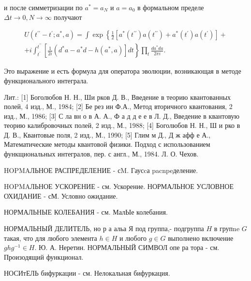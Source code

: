 \documentclass[10pt]{article}
\begin{document}
и после симметризации по $a^{*}=a_{N}$ и $a=a_{0}$ в формальном пределе $\Delta t \rightarrow 0, N \rightarrow \infty$ получают



\[

\begin{gathered}

U\left(t^{\prime \prime}-t^{\prime} ; a^{*}, a\right)=\int \exp \left\{\frac{1}{2}\left[a^{*}\left(t^{\prime \prime}\right) a\left(t^{\prime \prime}\right)+a^{*}\left(t^{\prime}\right) a\left(t^{\prime}\right)\right]+\right. \\

+i \int_{t^{\prime}}^{t^{\prime \prime}}\left[\frac{1}{2 i}\left(d^{*} a-a^{*} d-h\left(a^{*}, a\right)\right] d t\right\} \prod_{t} \frac{d a^{*} d a}{2 \pi i} .

\end{gathered}

\]



Это выражение и есть формула для оператора эволюции, возникающая в методе функционального интеграла.



Лит.: [1] Боголюбов Н. Н., Ши рков Д. В., Введение в теорию квантованных полей, 4 изд., М., 1984; [2] Бе рез ин Ф.А., Метод вторичного квантования, 2 изд., М., 1986; [3] С ла вн о в А. А., Ф а д д е е в Л. Д., Введение в квантовую теорию калибровочных полей, 2 изд., М., 1988; [4] Боголюбов Н. Н., Ш и рко в Д. В., Квантовые поля, 2 изд., М., 1990; [5] Глим м Д., Д ж афф е А., Математические методы квантовой физики. Подход с использованием функщиональных интегралов, пер. с англ., М., 1984. Л. $О$. Чехов.



HOPMAЛЬНОЕ РАСПРЕДЕЛЕНИЕ - сM. Гаусcа pacnpeделение.



HOPMAЛЬНОЕ УСКОРЕНИЕ - см. Ускорение. НОРМАЛЬНОЕ УСЛОВНОЕ ОХИДАНИЕ - сМ. Условно ожидание.



НОРМАЛЬНЫЕ КОЛЕБАНИЯ - см. МалЫе колебания.



НОРМАЛЬНЫЙ ДЕЛИТЕЛЬ, но р а альа Я под группа,- подгруппа $H$ в групne $G$ такая, что для любого элемента $h \in H$ и любого $g \in G$ выполнено включение $g h g^{-1} \in H$. Ю. А. Неретин. НОРМАЛЬНЫЙ СИМВОЛ опе ра тора - см. Произодящий функционал.



НОСИтЕЛЬ бифуркации - см. Нелокальная бифуркация.
\end{document}
